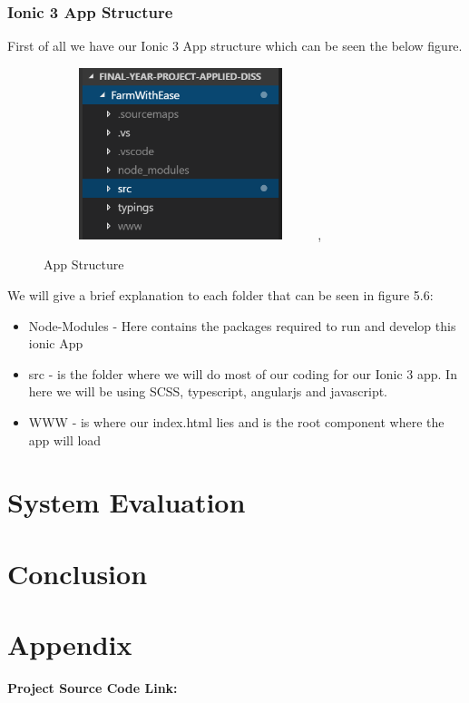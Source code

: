 \documentclass[12pt,a4paper,oneside,openany]{book}
\begin{document}
\subsection{Ionic 3 App Structure}
First of all we have our Ionic 3 App structure which can be seen the below figure.

\begin{figure}[ht]
\renewcommand\thefigure{5.6}
\centering
\includegraphics[width=8cm,height=5cm]{Images/app.png},
\caption{App Structure}
\label{app}
\end{figure}

We will give a brief explanation to each folder that can be seen in figure 5.6:

\begin{itemize}
    \item Node-Modules - Here contains the packages required to run and develop this ionic App
    \item src - is the folder where we will do most of our coding for our Ionic 3 app. In here we will be using SCSS, typescript, angularjs and javascript.
    \item WWW - is where our index.html lies and is the root component where the app will load
\end{itemize}





\chapter{System Evaluation}

\chapter{Conclusion}

\chapter{Appendix}

\textbf{Project Source Code Link:} \\




\nocite{*}
\end{document}
